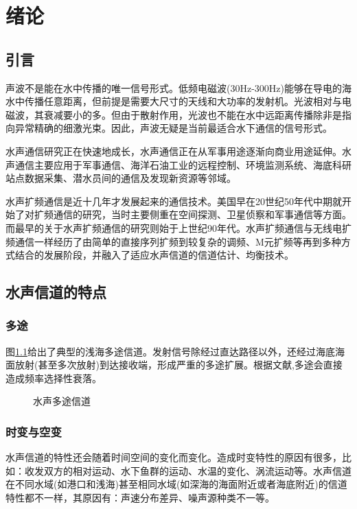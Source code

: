 \chapter{绪论}
\section{引言}
声波不是能在水中传播的唯一信号形式。低频电磁波(30Hz-300Hz)能够在导电的海水中传播任意距离，但前提是需要大尺寸的天线和大功率的发射机。光波相对与电磁波，其衰减要小的多。但由于散射作用，光波也不能在水中远距离传播除非是指向异常精确的细激光束。因此，声波无疑是当前最适合水下通信的信号形式。

水声通信研究正在快速地成长，水声通信正在从军事用途逐渐向商业用途延伸。水声通信主要应用于军事通信、海洋石油工业的远程控制、环境监测系统、海底科研站点数据采集、潜水员间的通信及发现新资源等邻域。

水声扩频通信是近十几年才发展起来的通信技术。美国早在20世纪50年代中期就开始了对扩频通信的研究，当时主要侧重在空间探测、卫星侦察和军事通信等方面。而最早的关于水声扩频通信的研究则始于上世纪90年代。水声扩频通信与无线电扩频通信一样经历了由简单的直接序列扩频到较复杂的调频、M元扩频等再到多种方式结合的发展阶段，并融入了适应水声信道的信道估计、均衡技术。

\section{水声信道的特点}
\subsection{多途}
图\ref{fig:channel}给出了典型的浅海多途信道。发射信号除经过直达路径以外，还经过海底海面放射(甚至多次放射)到达接收端，形成严重的多途扩展。根据文献\cite{俊英1992水下声信道},多途会直接造成频率选择性衰落。
\begin{figure}
\centering

\caption{水声多途信道}
\label{fig:channel}
\end{figure}

\subsection{时变与空变}
水声信道的特性还会随着时间空间的变化而变化。造成时变特性的原因有很多，比如：收发双方的相对运动、水下鱼群的运动、水温的变化、涡流运动等。水声信道在不同水域(如港口和浅海)甚至相同水域(如深海的海面附近或者海底附近)的信道特性都不一样，其原因有：声速分布差异、噪声源种类不一等。


